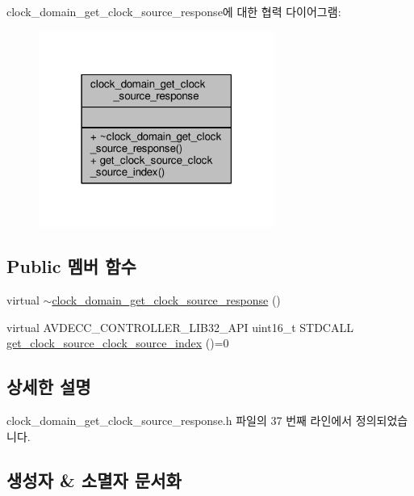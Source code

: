 clock\+\_\+domain\+\_\+get\+\_\+clock\+\_\+source\+\_\+response에 대한 협력 다이어그램\+:
\nopagebreak
\begin{figure}[H]
\begin{center}
\leavevmode
\includegraphics[width=219pt]{classavdecc__lib_1_1clock__domain__get__clock__source__response__coll__graph}
\end{center}
\end{figure}
\subsection*{Public 멤버 함수}
\begin{DoxyCompactItemize}
\item 
virtual \hyperlink{classavdecc__lib_1_1clock__domain__get__clock__source__response_ad14763a79ddd9322b0a7a28bbe0ea16c}{$\sim$clock\+\_\+domain\+\_\+get\+\_\+clock\+\_\+source\+\_\+response} ()
\item 
virtual A\+V\+D\+E\+C\+C\+\_\+\+C\+O\+N\+T\+R\+O\+L\+L\+E\+R\+\_\+\+L\+I\+B32\+\_\+\+A\+PI uint16\+\_\+t S\+T\+D\+C\+A\+LL \hyperlink{classavdecc__lib_1_1clock__domain__get__clock__source__response_a99d78d352ef63d5dbe979572938f98f7}{get\+\_\+clock\+\_\+source\+\_\+clock\+\_\+source\+\_\+index} ()=0
\end{DoxyCompactItemize}


\subsection{상세한 설명}


clock\+\_\+domain\+\_\+get\+\_\+clock\+\_\+source\+\_\+response.\+h 파일의 37 번째 라인에서 정의되었습니다.



\subsection{생성자 \& 소멸자 문서화}
